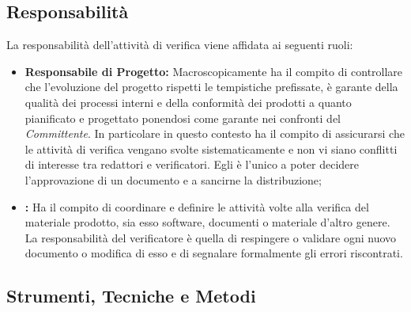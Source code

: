 \subsection{Responsabilità}

La responsabilità dell'attività di verifica viene affidata ai seguenti ruoli:

\begin{itemize}
	\item \textbf{Responsabile di Progetto:} Macroscopicamente ha il compito di controllare che l'evoluzione del progetto rispetti le tempistiche prefissate, è garante della qualità dei processi interni e della conformità dei prodotti a quanto pianificato e progettato ponendosi come garante nei confronti del \textit{Committente}. In particolare in questo contesto ha il compito di assicurarsi che le attività di verifica vengano svolte sistematicamente e non vi siano conflitti di interesse tra redattori e verificatori. Egli è l'unico a poter decidere l'approvazione di un documento e a sancirne la distribuzione;
	\item \textbf{\ruoloVerificatore:} Ha il compito di coordinare e definire le attività volte alla verifica del materiale prodotto, sia esso software, documenti o materiale d'altro genere. La responsabilità del verificatore è quella di respingere o validare ogni nuovo documento o modifica di esso e di segnalare formalmente gli errori riscontrati.
\end{itemize}

\subsection{Strumenti, Tecniche e Metodi}
